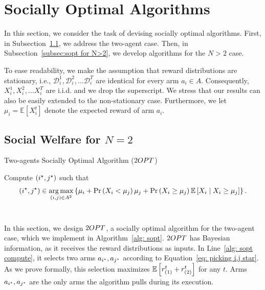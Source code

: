 \section{Socially Optimal Algorithms}\label{appendix:sociallyopt}
In this section, we consider the task of devising socially optimal algorithms. First, in Subsection~\ref{subsec:sw N=2}, we address the two-agent case. Then, in Subsection~\ref{subsec:sopt for N>2}, we develop algorithms for the $N>2$ case.

To ease readability, we make the assumption that reward distributions are stationary, i.e., $\mathcal{D}^1_i, \mathcal{D}^2_i, \dots \mathcal{D}^T_i$ are identical for every arm $a_i \in A$. Consequently,  $X^1_i, X^2_i, \dots X^T_i$ are i.i.d. and we drop the superscript. We stress that our results can also be easily extended to the non-stationary case. Furthermore, we let $\mu_i = \mathbb{E}[X_i^t]$ denote the expected reward of arm $a_i$.

\subsection{Social Welfare for $N=2$}
\label{subsec:sw N=2}

\begin{algorithm}[t]
\caption{Two-agents Socially Optimal Algorithm ($2OPT$)}
\label{alg: sopt}
\LinesNumbered
\DontPrintSemicolon 
{}
Compute $({i^\star}, {j^\star})$ such that
\label{alg: sopt compute}
\begin{align}\label{eq: picking i,j star}
({i^\star}, {j^\star}) \in \operatorname*{arg\,max}_{(i,j) \in A^2} \left\{ \mu_i  + \Pr\left( X_i < \mu_j \right)\mu_j+\Pr\left( X_i \geq \mu_j \right)\mathbb{E}\left[ X_i \mid X_i \geq \mu_j \right]  \right\}.
\end{align}\\
\end{algorithm}
In this section, we design $2OPT$, a socially optimal algorithm for the two-agent case, which we implement in Algorithm~\ref{alg: sopt}. $2OPT$ has Bayesian information, as it receives the reward distributions as inputs. In Line~\ref{alg: sopt compute}, it selects two arms $a_{{i^\star}}, a_{{j^\star}}$ according to Equation~\eqref{eq: picking i,j star}. As we prove formally, this selection maximizes $\mathbb{E}\left[ {r^t_{(1)}}+{r^t_{(2)}} \right]$ for any $t$. Arms $a_{{i^\star}}, a_{{j^\star}}$ are the only arms the algorithm pulls during its execution.

